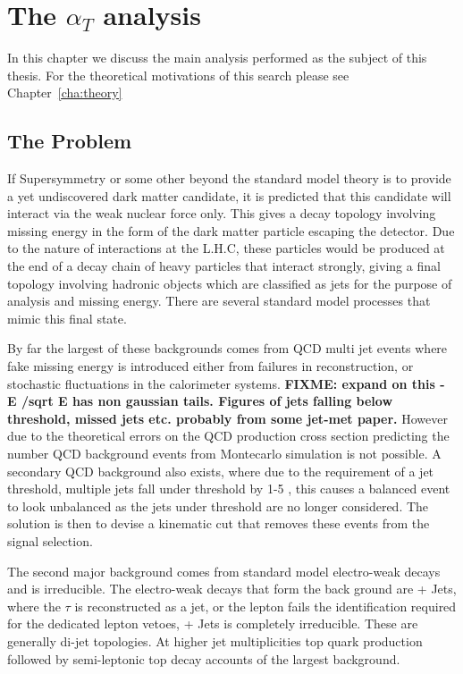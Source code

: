 \chapter{The $\alpha_{T}$ analysis} %
\label{cha:the_t_analysis}
In this chapter we discuss the main analysis performed as the subject of this 
thesis. For the theoretical motivations of this search please see 
Chapter~\ref{cha:theory}
\section{The Problem} %
\label{sec:the_problem}
If Supersymmetry or some other beyond the standard model theory is to provide a 
yet undiscovered dark matter candidate, it is predicted that this candidate 
will interact via the weak nuclear force only. This gives a decay topology 
involving missing energy in the form of the dark matter particle escaping the 
detector. Due to the nature of interactions at the L.H.C, these particles would 
be produced at the end of a decay chain of heavy particles that interact 
strongly, giving a final topology involving hadronic objects which are 
classified as jets for the purpose of analysis and missing energy.
There are several standard model processes that mimic this final state.

By far the largest of these backgrounds comes from QCD multi jet events where 
fake missing energy is introduced either from failures in reconstruction, or 
stochastic fluctuations in the calorimeter systems.
\textbf{FIXME: expand on this - E /sqrt E has non gaussian tails. Figures of 
jets falling below threshold, missed jets etc. probably from some jet-met 
paper.}
However due to the theoretical errors on the QCD production cross section 
predicting the number QCD background events from Montecarlo simulation is not 
possible.
A secondary QCD background also exists, where due to the requirement of a jet 
\ET threshold, multiple jets fall under threshold by 1-5 \GeV, this causes a 
balanced event to look unbalanced as the jets under threshold are no longer 
considered.
The solution is then to devise a kinematic cut that removes these events from 
the signal selection.

The second major background comes from standard model electro-weak decays and 
is irreducible. The electro-weak decays that form the back ground are 
\HepProcess{\PW\to\Ptau\Pnu} + Jets, where the $\tau$ is reconstructed as a 
jet, or the lepton fails the identification required for the dedicated lepton 
vetoes, \HepProcess{\PZ\to\Pnu\APnu} + Jets is completely irreducible. These 
are generally di-jet topologies. At higher jet multiplicities top quark 
production followed by semi-leptonic top decay accounts of the largest 
background.


